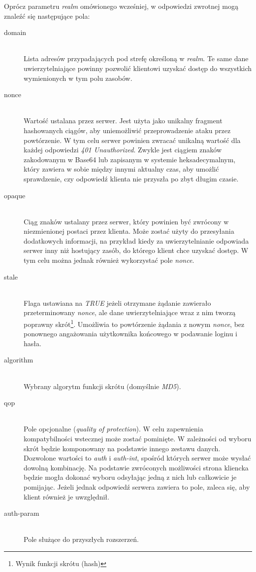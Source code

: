 \documentclass[11pt]{aghdpl}
\begin{document}
Oprócz parametru \emph{realm} omówionego wcześniej, w odpowiedzi zwrotnej mogą znaleźć się następujące pola:
\begin{description}
\item[domain] \hfill \\
Lista adresów przypadających pod strefę określoną w \emph{realm}. Te same dane uwierzytelniające powinny pozwolić klientowi uzyskać dostęp do wszystkich wymienionych w tym polu zasobów.
\item[nonce] \hfill \\
Wartość ustalana przez serwer. Jest użyta jako unikalny fragment hashowanych ciągów, aby uniemożliwić przeprowadzenie ataku przez powtórzenie. W tym celu serwer powinien zwracać unikalną wartość dla każdej odpowiedzi \emph{401 Unauthorized}. Zwykle jest ciągiem znaków zakodowanym w Base64 lub zapisanym w systemie heksadecymalnym, który zawiera w sobie między innymi aktualny czas, aby umożlić sprawdzenie, czy odpowiedź klienta nie przyszła po zbyt długim czasie.
\item[opaque] \hfill \\
Ciąg znaków ustalany przez serwer, który powinien być zwrócony w niezmienionej postaci przez klienta. Może zostać użyty do przesyłania dodatkowych informacji, na przykład kiedy za uwierzytelnianie odpowiada serwer inny niż hostujący zasób, do którego klient chce uzyskać dostęp. W tym celu można jednak również wykorzystać pole \emph{nonce}.
\item[stale] \hfill \\
Flaga ustawiana na \emph{TRUE} jeżeli otrzymane żądanie zawierało przeterminowany \emph{nonce}, ale dane uwierzytelniające wraz z nim tworzą poprawny skrót\footnote{Wynik funkcji skrótu (hash)}. Umożliwia to powtórzenie żądania z nowym \emph{nonce}, bez ponownego angażowania użytkownika końcowego w podawanie loginu i hasła.
\item[algorithm] 
\hfill \\Wybrany algorytm funkcji skrótu (domyślnie \emph{MD5}).
\item[qop] \hfill \\
Pole opcjonalne (\emph{quality of protection}). W celu zapewnienia kompatybilności wstecznej może zostać pominięte. W zależności od wyboru skrót będzie komponowany na podstawie innego zestawu danych. Dozwolone wartości to \emph{auth} i \emph{auth-int}, spośród których serwer może wysłać dowolną kombinację. Na podstawie zwróconych możliwości strona kliencka będzie mogła dokonać wyboru odsyłając jedną z nich lub całkowicie je pomijając. Jeżeli jednak odpowiedź serwera zawiera to pole, zaleca się, aby klient również je uwzględnił.
\item[auth-param] \hfill \\
Pole służące do przyszłych rozszerzeń.
\end{description}
\end{document}
